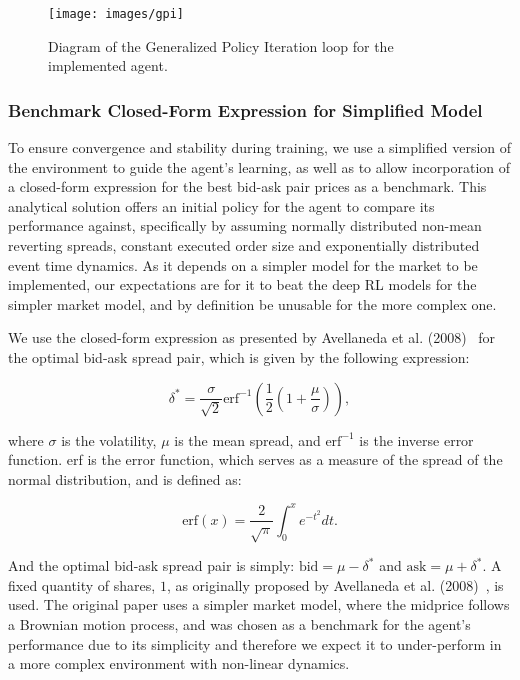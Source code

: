 \begin{figure}[H]
    \centering
    \texttt{[image: images/gpi]}
    \caption{Diagram of the Generalized Policy Iteration loop for the implemented agent.}
    \label{fig:gpi}
\end{figure}

\subsubsection{Benchmark Closed-Form Expression for Simplified Model}
To ensure convergence and stability during training, we use a simplified version of the environment to guide the agent's learning,
as well as to allow incorporation of a closed-form expression for the best bid-ask pair prices as a benchmark.
This analytical solution offers an initial policy for the agent to compare its performance against,
specifically by assuming normally distributed non-mean reverting spreads, constant executed order size and exponentially distributed event time dynamics.
As it depends on a simpler model for the market to be implemented, our expectations are for it to beat the deep RL models for the simpler market model,
and by definition be unusable for the more complex one.

We use the closed-form expression as presented by Avellaneda et al. (2008)~\cite{Avellaneda2008} for the optimal bid-ask spread pair,
which is given by the following expression:

\[
    \delta^* = \frac{\sigma}{\sqrt{2}} \text{erf}^{-1} \left( \frac{1}{2} \left( 1 + \frac{\mu}{\sigma} \right) \right),
\]

where $\sigma$ is the volatility, $\mu$ is the mean spread, and $\text{erf}^{-1}$ is the inverse error function.
erf is the error function, which serves as a measure of the spread of the normal distribution, and is defined as:

\[
    \text{erf}(x) = \frac{2}{\sqrt{\pi}} \int_{0}^{x} e^{-t^2} dt.
\]

And the optimal bid-ask spread pair is simply: $\text{bid} = \mu - \delta^*$ and $\text{ask} = \mu + \delta^*$.
A fixed quantity of shares, $1$, as originally proposed by Avellaneda et al. (2008)~\cite{Avellaneda2008}, is used.
The original paper uses a simpler market model, where the midprice follows a Brownian motion process,
and was chosen as a benchmark for the agent's performance due to its simplicity and therefore we
expect it to under-perform in a more complex environment with non-linear dynamics.

